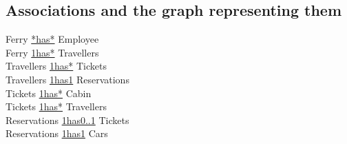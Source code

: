 \subsection{Associations and the graph representing them}
Ferry \underline{*\phantom{x}\hspace{5ex}has\phantom{x}\hspace{5ex}*} Employee\\
Ferry \underline{1\phantom{x}\hspace{5ex}has\phantom{x}\hspace{5ex}*} Travellers\\
Travellers \underline{1\phantom{x}\hspace{5ex}has\phantom{x}\hspace{5ex}*} Tickets\\
Travellers \underline{1\phantom{x}\hspace{5ex}has\phantom{x}\hspace{5ex}1} Reservations\\
Tickets \underline{1\phantom{x}\hspace{5ex}has\phantom{x}\hspace{5ex}*} Cabin\\
Tickets \underline{1\phantom{x}\hspace{5ex}has\phantom{x}\hspace{5ex}*} Travellers\\
Reservations \underline{1\phantom{x}\hspace{5ex}has\phantom{x}\hspace{5ex}0..1} Tickets\\
Reservations \underline{1\phantom{x}\hspace{5ex}has\phantom{x}\hspace{5ex}1} Cars\\
